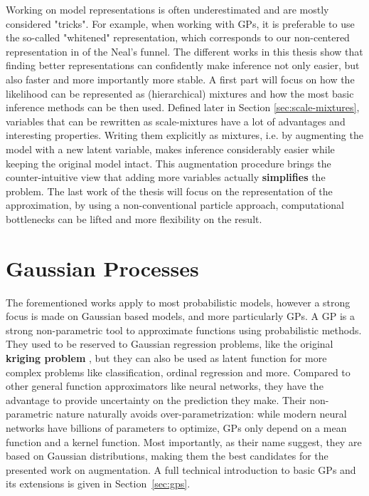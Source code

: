 Working on model representations is often underestimated and are mostly considered "tricks".
For example, when working with \acf{GPs}, it is preferable to use the so-called "whitened" representation, which corresponds to our non-centered representation in of the Neal's funnel.
The different works in this thesis show that finding better representations can confidently make inference not only easier, but also faster and more importantly more stable. 
A first part will focus on how the likelihood can be represented as (hierarchical) mixtures and how the most basic inference methods can be then used.
Defined later in Section \ref{sec:scale-mixtures}, variables that can be rewritten as scale-mixtures have a lot of advantages and interesting properties.
Writing them explicitly as mixtures, i.e. by augmenting the model with a new latent variable, makes inference considerably easier while keeping the original model intact.
This augmentation procedure brings the counter-intuitive view that adding more variables actually \textbf{simplifies} the problem.
The last work of the thesis will focus on the representation of the approximation, by using a non-conventional particle approach, computational bottlenecks can be lifted and more flexibility on the result. 


\section{Gaussian Processes}

The forementioned works apply to most probabilistic models, however a strong focus is made on Gaussian based models, and more particularly \acf{GPs}.
A \ac{GP} is a strong non-parametric tool to approximate functions using probabilistic methods.
They used to be reserved to Gaussian regression problems, like the original \textbf{kriging problem} \cite{cressie1990origins}, but they can also be used as latent function for more complex problems like classification, ordinal regression and more.
Compared to other general function approximators like neural networks, they have the advantage to provide uncertainty on the prediction they make.
Their non-parametric nature naturally avoids over-parametrization: while modern neural networks have billions of parameters to optimize, \ac{GPs} only depend on a mean function and a kernel function.
Most importantly, as their name suggest, they are based on Gaussian distributions, making them the best candidates for the presented work on augmentation.
A full technical introduction to basic \ac{GPs} and its extensions is given in Section~\ref{sec:gps}.

